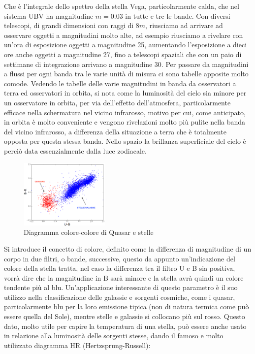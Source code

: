 \documentclass[a4paper,twoside,openany,notitlepage]{book}
\theoremstyle{definition}
\theoremstyle{plain}
\begin{document}
Che è l'integrale dello spettro della stella Vega, particolarmente calda, che nel sistema UBV ha magnitudine $m=0.03$ in tutte e tre le bande. Con diversi telescopi, di grandi dimensioni con raggi di $8m$, riusciamo ad arrivare ad osservare oggetti a magnitudini molto alte, ad esempio riusciamo a rivelare con un'ora di esposizione oggetti a magnitudine 25, aumentando l'esposizione a dieci ore anche oggetti a magnitudine 27, fino a telescopi spaziali che con un paio di settimane di integrazione arrivano a magnitudine 30. Per passare da magnitudini a flussi per ogni banda tra le varie unità di misura ci sono tabelle apposite molto comode. Vedendo le tabelle delle varie magnitudini in banda da osservatori a terra ed osservatori in orbita, si nota come la luminosità del cielo sia minore per un osservatore in orbita, per via dell'effetto dell'atmosfera, particolarmente efficace nella schermatura nel vicino infrarosso, motivo per cui, come anticipato, in orbita è molto conveniente e vengono rivelazioni molto più pulite nella banda del vicino infrarosso, a differenza della situazione a terra che è totalmente opposta per questa stessa banda. Nello spazio la brillanza superficiale del cielo è perciò data essenzialmente dalla luce zodiacale.

\begin{figure}
	\vspace{-15pt}
	\centering
	\includegraphics[width=0.39\textwidth]{./Immagini/Capitolo1/diag_col-col_quasar_stelle.PNG}
	\vspace{-5pt}
	\caption*{Diagramma colore-colore di Quasar e stelle}
	\vspace{-15pt}
\end{figure}

Si introduce il concetto di colore, definito come la differenza di magnitudine di un corpo in due filtri, o bande, successive, questo da appunto un'indicazione del colore della stella tratta, nel caso la differenza tra il filtro U e B sia positiva, vorrà dire che la magnitudine in B sarà minore e la stella avrà quindi un colore tendente più al blu. Un'applicazione interessante di questo parametro è il suo utilizzo nella classificazione delle galassie e sorgenti cosmiche, come i quasar, particolarmente blu per la loro emissione tipica (non di natura termica come può essere quella del Sole), mentre stelle e galassie si collocano più sul rosso. Questo dato, molto utile per capire la temperatura di una stella, può essere anche usato in relazione alla luminosità delle sorgenti stesse, dando il famoso e molto utilizzato diagramma HR (Hertzsprung-Russell):
\end{document}
